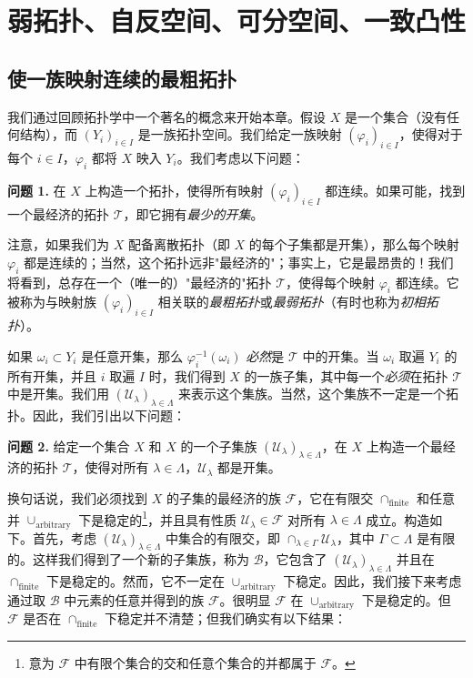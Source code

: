 \chapter{弱拓扑、自反空间、可分空间、一致凸性}

\section{使一族映射连续的最粗拓扑}

我们通过回顾拓扑学中一个著名的概念来开始本章。假设 $X$ 是一个集合（没有任何结构），而 $(Y_i)_{i \in I}$ 是一族拓扑空间。我们给定一族映射 $(\varphi_i)_{i \in I}$，使得对于每个 $i \in I$，$\varphi_i$ 都将 $X$ 映入 $Y_i$。我们考虑以下问题：

\textbf{问题 1.} 在 $X$ 上构造一个拓扑，使得所有映射 $(\varphi_i)_{i \in I}$ 都连续。如果可能，找到一个最经济的拓扑 $\mathcal{T}$，即它拥有\textit{最少的开集}。

注意，如果我们为 $X$ 配备离散拓扑（即 $X$ 的每个子集都是开集），那么每个映射 $\varphi_i$ 都是连续的；当然，这个拓扑远非"最经济的"；事实上，它是最昂贵的！我们将看到，总存在一个（唯一的）"最经济的"拓扑 $\mathcal{T}$，使得每个映射 $\varphi_i$ 都连续。它被称为与映射族 $(\varphi_i)_{i \in I}$ 相关联的\textit{最粗拓扑}或\textit{最弱拓扑}（有时也称为\textit{初相拓扑}）。

如果 $\omega_i \subset Y_i$ 是任意开集，那么 $\varphi_i^{-1}(\omega_i)$ \textit{必然}是 $\mathcal{T}$ 中的开集。当 $\omega_i$ 取遍 $Y_i$ 的所有开集，并且 $i$ 取遍 $I$ 时，我们得到 $X$ 的一族子集，其中每一个\textit{必须}在拓扑 $\mathcal{T}$ 中是开集。我们用 $(\mathcal{U}_\lambda)_{\lambda \in \Lambda}$ 来表示这个集族。当然，这个集族不一定是一个拓扑。因此，我们引出以下问题：

\textbf{问题 2.} 给定一个集合 $X$ 和 $X$ 的一个子集族 $(\mathcal{U}_\lambda)_{\lambda \in \Lambda}$，在 $X$ 上构造一个最经济的拓扑 $\mathcal{T}$，使得对所有 $\lambda \in \Lambda$，$\mathcal{U}_\lambda$ 都是开集。

换句话说，我们必须找到 $X$ 的子集的最经济的族 $\mathcal{F}$，它在有限交 $\cap_{\text{finite}}$ 和任意并 $\cup_{\text{arbitrary}}$ 下是稳定的\footnote{意为 $\mathcal{F}$ 中有限个集合的交和任意个集合的并都属于 $\mathcal{F}$。}，并且具有性质 $\mathcal{U}_\lambda \in \mathcal{F}$ 对所有 $\lambda \in \Lambda$ 成立。构造如下。首先，考虑 $(\mathcal{U}_\lambda)_{\lambda \in \Lambda}$ 中集合的有限交，即 $\cap_{\lambda \in \Gamma} \mathcal{U}_\lambda$，其中 $\Gamma \subset \Lambda$ 是有限的。这样我们得到了一个新的子集族，称为 $\mathcal{B}$，它包含了 $(\mathcal{U}_\lambda)_{\lambda \in \Lambda}$ 并且在 $\cap_{\text{finite}}$ 下是稳定的。然而，它不一定在 $\cup_{\text{arbitrary}}$ 下稳定。因此，我们接下来考虑通过取 $\mathcal{B}$ 中元素的任意并得到的族 $\mathcal{F}$。很明显 $\mathcal{F}$ 在 $\cup_{\text{arbitrary}}$ 下是稳定的。但 $\mathcal{F}$ 是否在 $\cap_{\text{finite}}$ 下稳定并不清楚；但我们确实有以下结果：

